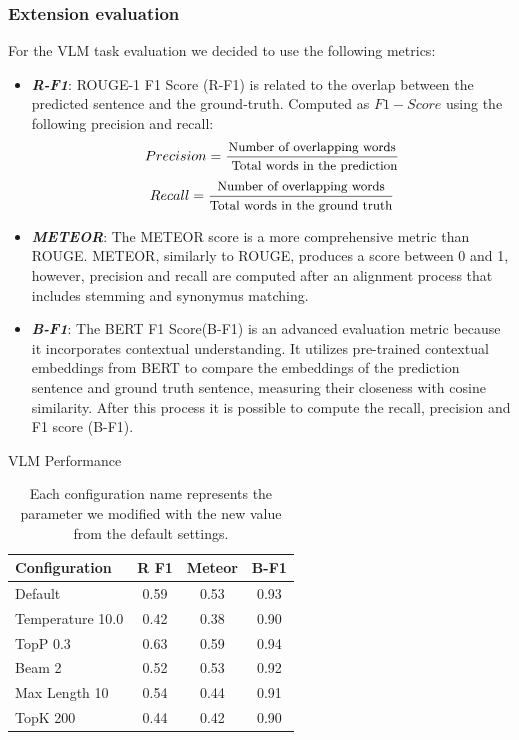 \documentclass[10pt,twocolumn,letterpaper]{article}
\begin{document}
\subsubsection{Extension evaluation}
For the VLM task evaluation we decided to use the following metrics:
\begin{itemize}
    \item \textit{\textbf{R-F1}}: ROUGE-1 F1 Score (R-F1) is related to the overlap between the predicted sentence and the ground-truth. Computed as $F1-Score$ using the following precision and recall: 
    \begin{equation*}
        Precision = \frac{\text{\small Number of overlapping words}}{\text{ \small Total words in the prediction}}
    \end{equation*}
     \begin{equation}
        Recall = \frac{\text{\small Number of overlapping words}}{\text{\small Total words in the ground truth}}
    \end{equation}
    \item \textit{\textbf{METEOR}}: The METEOR score is a more comprehensive metric than ROUGE. METEOR, similarly to ROUGE, produces a score between 0 and 1, however, precision and recall are computed after an alignment process that includes stemming and synonymus matching.
    \item \textit{\textbf{B-F1}}: The BERT F1 Score(B-F1) is an advanced evaluation metric because it incorporates contextual understanding. It utilizes pre-trained contextual embeddings from BERT to compare the embeddings of the prediction sentence and ground truth sentence, measuring their closeness with cosine similarity. After this process it is possible to compute the recall, precision and F1 score (B-F1).
\end{itemize}

\begin{table}[h]
\centering
\caption{VLM Performance}
\label{tab:comparisonSCore}
\begin{tabular}{@{}lccc@{}}
\toprule
Configuration & R F1 & Meteor & B-F1 \\ \midrule
Default & 0.59 & 0.53 & 0.93 \\
Temperature 10.0 & 0.42 & 0.38 & 0.90 \\
TopP 0.3 & 0.63 & 0.59 & 0.94 \\
Beam 2 & 0.52 & 0.53 & 0.92 \\
Max Length 10 & 0.54 & 0.44 & 0.91 \\
TopK 200 & 0.44 & 0.42 & 0.90\\
\bottomrule
\end{tabular}
\captionsetup{font=footnotesize}
\caption*{Each configuration name represents the parameter we modified with the new value from the default settings.}
\end{table}
\end{document}
